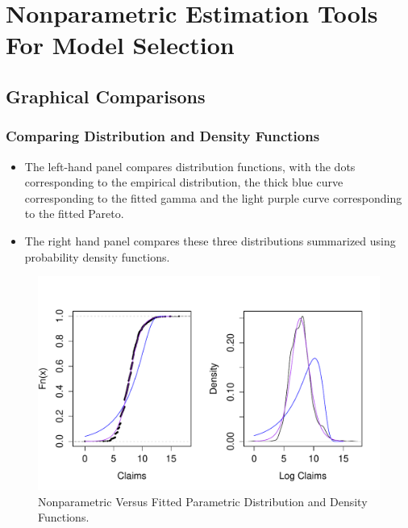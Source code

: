 \documentclass{beamer}
\begin{document}
\section{Nonparametric Estimation Tools For Model Selection}

\subsection{Graphical Comparisons}

\begin{frame}[shrink=2]
\frametitle{Comparing Distribution and Density Functions}
\begin{itemize}
\item The left-hand panel compares distribution functions, with the dots corresponding to the empirical distribution, the thick blue curve corresponding to the fitted gamma and the light purple curve corresponding to the fitted Pareto.
\item The right hand panel compares these three distributions summarized using probability density functions.
\end{itemize}
\begin{figure}[htp]
\begin{center}
    \includegraphics[width=.6\textwidth]{Figures/ComparisonCDFPDF.pdf}
     \caption{\label{F:ComparisonCDFPDF}Nonparametric Versus Fitted Parametric Distribution and Density Functions.}
\end{center}
\end{figure}
\end{frame}
\end{document}
